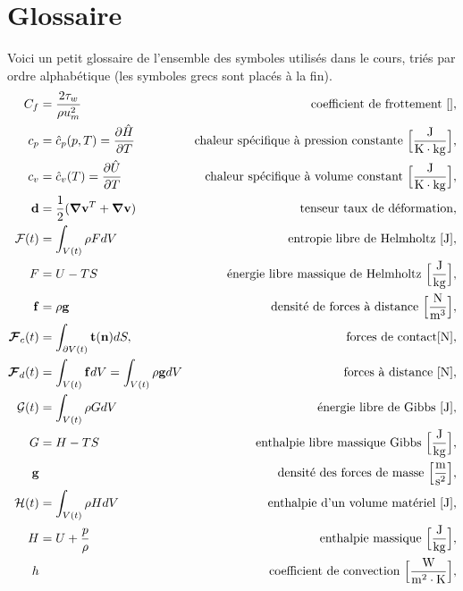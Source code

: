 
\chapter{Glossaire}
  Voici un petit glossaire de l'ensemble des symboles utilisés dans le cours, triés par ordre alphabétique (les symboles grecs sont placés à la fin).
  \begingroup
    \allowdisplaybreaks
    \begin{align*}
      C_f &= \frac{2\tau_w}{\rho u_m^2} & \textrm{coefficient de frottement } [],\\
      c_p &= \hat{c}_p(p,T) = \pdv{\hat{H}}{T} & \textrm{chaleur spécifique à pression constante } \Big[\si{\frac{J}{K \cdot kg}}\Big],\\
      c_v &= \hat{c}_v (T) = \pdv{\hat{U}}{T} & \textrm{chaleur spécifique à volume constant } \Big[\si{\frac{J}{K \cdot kg}}\Big],\\
      \vb{d} &= \recip{2}(\grad\vb{v}^T + \grad\vb{v}) & \textrm{tenseur taux de déformation},\\
      \mathcal{F}(t) &= \int_{V(t)} \rho F dV & \textrm{entropie libre de Helmholtz } [\si{J}],\\
      F &= U - TS & \textrm{énergie libre massique de Helmholtz } \Big[\si{\frac{J}{kg}}\Big],\\
      \vb{f} &= \rho \vb{g} & \textrm{densité de forces à distance } \Big[\si{\frac{N}{m^3}}\Big], \\
      \bs{\mathcal{F}}_c (t) &= \int_{\partial V(t)} \vb{t}(\vb{n}) dS, & \textrm{forces de contact} [\si{N}],\\
      \bs{\mathcal{F}}_d (t) &= \int_{V(t)} \vb{f} dV = \int_{V(t)} \rho \vb{g} dV & \textrm{forces à distance } [\si{N}],\\
      \mathcal{G}(t) &= \int_{V(t)} \rho G dV & \textrm{énergie libre de Gibbs } [\si{J}],\\
      G &= H -TS & \textrm{enthalpie libre massique Gibbs } \Big[\si{\frac{J}{kg}}\Big],\\
      \vb{g} & & \textrm {densité des forces de masse } \Big[\si{\frac{m}{s^2}}\Big],\\
      \mathcal{H}(t) &= \int_{V(t)} \rho H dV & \textrm{enthalpie d'un volume matériel } [\si{J}],\\
      H &= U + \frac{p}{\rho} & \textrm{enthalpie massique } \Big[\si{\frac{J}{kg}}\Big],\\
      h & & \textrm{coefficient de convection } \Big[\si{\frac{W}{m^2 \cdot K}}\Big], \\

\end{align*}
